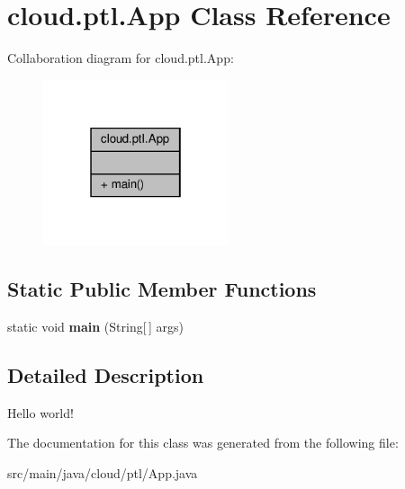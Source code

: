 \hypertarget{classcloud_1_1ptl_1_1App}{}\section{cloud.\+ptl.\+App Class Reference}
\label{classcloud_1_1ptl_1_1App}


Collaboration diagram for cloud.\+ptl.\+App\+:
\nopagebreak
\begin{figure}[H]
\begin{center}
\leavevmode
\includegraphics[width=154pt]{classcloud_1_1ptl_1_1App__coll__graph}
\end{center}
\end{figure}
\subsection*{Static Public Member Functions}
\begin{DoxyCompactItemize}
\item 
\mbox{\label{classcloud_1_1ptl_1_1App_ace8b2eb7c056f71d94d91f150d976319}} 
static void {\bfseries main} (String\mbox{[}$\,$\mbox{]} args)
\end{DoxyCompactItemize}


\subsection{Detailed Description}
Hello world! 

The documentation for this class was generated from the following file\+:\begin{DoxyCompactItemize}
\item 
src/main/java/cloud/ptl/App.\+java\end{DoxyCompactItemize}
